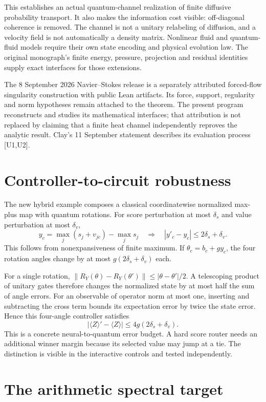 This establishes an actual quantum-channel realization of finite diffusive probability transport. It also makes the information cost visible: off-diagonal coherence is removed. The channel is not a unitary relabeling of diffusion, and a velocity field is not automatically a density matrix. Nonlinear fluid and quantum-fluid models require their own state encoding and physical evolution law. The original monograph's finite energy, pressure, projection and residual identities supply exact interfaces for those extensions.

The 8 September 2026 Navier--Stokes release is a separately attributed forced-flow singularity construction with public Lean artifacts. Its force, support, regularity and norm hypotheses remain attached to the theorem. The present program reconstructs and studies its mathematical interfaces; that attribution is not replaced by claiming that a finite heat channel independently reproves the analytic result. Clay's 11 September statement describes its evaluation process [U1,U2].

\section{Controller-to-circuit robustness}

The new hybrid example composes a classical coordinatewise normalized max-plus map with quantum rotations. For score perturbation at most $\delta_s$ and value perturbation at most $\delta_v$,
\[
 y_c=\max_j(s_j+v_{jc})-\max_j s_j
 \quad\Longrightarrow\quad
 |y'_c-y_c|\le2\delta_s+\delta_v.
\]
This follows from nonexpansiveness of finite maximum. If $\theta_c=b_c+g y_c$, the four rotation angles change by at most $g(2\delta_s+\delta_v)$ each.

For a single rotation, $\|R_Y(\theta)-R_Y(\theta')\|\le|\theta-\theta'|/2$. A telescoping product of unitary gates therefore changes the normalized state by at most half the sum of angle errors. For an observable of operator norm at most one, inserting and subtracting the cross term bounds its expectation error by twice the state error. Hence this four-angle controller satisfies
\[
 |\langle Z\rangle'-\langle Z\rangle|
 \le4g(2\delta_s+\delta_v).
\]
This is a concrete neural-to-quantum error budget. A hard score router needs an additional winner margin because its selected value may jump at a tie. The distinction is visible in the interactive controls and tested independently.

\section{The arithmetic spectral target}

